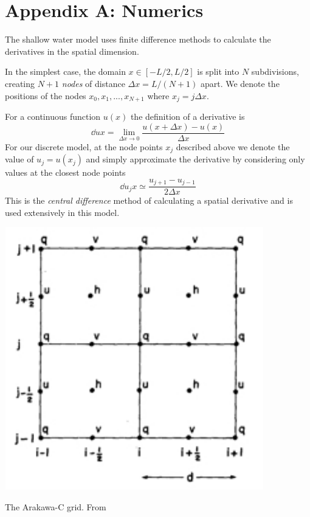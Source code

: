 \documentclass[a4paper]{tufte-handout}
\begin{document}
  \section{Appendix A: Numerics}
  \label{sec:appendixa}

  \noindent The shallow water model uses finite difference methods to calculate
  the derivatives in the spatial dimension.

  In the simplest case, the domain $x \in [-L/2, L/2]$ is split into $N$
  subdivisions, creating $N+1$ \emph{nodes} of distance $\Delta x = L/(N+1)$ apart.
  We denote the positions of the nodes $x_0, x_1, ..., x_{N+1}$ where $x_j = j \Delta x$.

  For a continuous function $u(x)$ the definition of a derivative is
  \begin{equation}
    \dd{u}{x} = \lim_{\Delta x \to 0} \frac{u(x + \Delta x) - u(x)}{\Delta x}
  \end{equation}
  For our discrete model, at the node points $x_j$ described above we denote
  the value of $u_j = u(x_j)$ and simply approximate the derivative by considering
  only values at the closest node points
  \begin{equation}
    \label{eq:cendiff}
    \dd{u_j}{x} \simeq \frac{u_{j+1} - u_{j-1}}{2 \Delta x}
  \end{equation}
  This is the \emph{central difference} method of calculating a spatial derivative
  and is used extensively in this model.
  \begin{marginfigure}
    \includegraphics{cgrid}
    \caption{The Arakawa-C grid. From \citep{Arakawa:1981bx}}
    \label{fig:cgrid}
  \end{marginfigure}
\end{document}
